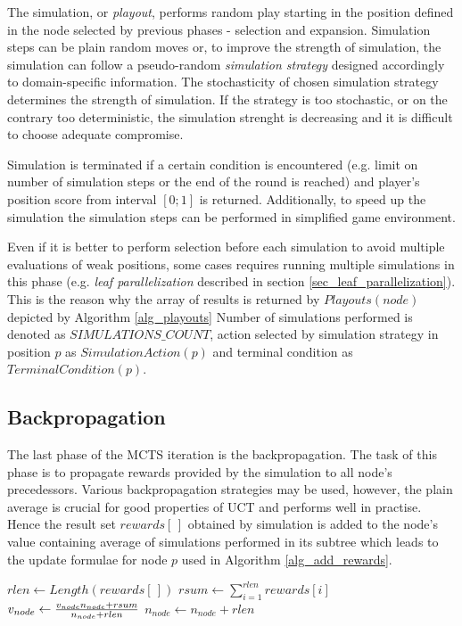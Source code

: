 The simulation, or \emph{playout}, performs random play starting in the position defined in the
node selected by previous phases - selection and expansion. Simulation steps can be plain
random moves or, to improve the strength of
simulation, the simulation can follow a pseudo-random \emph{simulation strategy} designed accordingly to
domain-specific information. The stochasticity of chosen simulation strategy determines the strength
of simulation. If the strategy is too stochastic, or on the contrary too deterministic, the
simulation strenght is decreasing and it is difficult to choose adequate compromise.

Simulation is terminated if a certain condition is encountered (e.g. limit on number of simulation
steps or the end of the round is reached) and player's position score from interval $[0;1]$ is
returned. Additionally, to speed up the simulation the simulation steps can be performed in
simplified game environment.

Even if it is better to perform selection before each simulation to avoid multiple 
evaluations of weak positions, some cases requires running multiple simulations in this phase
(e.g. \emph{leaf parallelization} described in section \ref{sec_leaf_parallelization}). This is
the reason why the array of results is returned by $Playouts(node)$ depicted by Algorithm
\ref{alg_playouts} Number of simulations performed is denoted as $SIMULATIONS\_COUNT$, action
selected by simulation strategy in position $p$ as $SimulationAction(p)$ and terminal condition
as $TerminalCondition(p)$.


\subsection{Backpropagation}

The last phase of the MCTS iteration is the backpropagation. The task of this phase is to propagate
rewards provided by the simulation to all node's precedessors. Various backpropagation strategies
may be used, however, the plain average is crucial for good properties of UCT and performs
well in
practise. Hence the result set $rewards[\,]$ obtained by simulation is added to the node's value containing
average of simulations performed in its subtree which leads to the update formulae for
node $p$ used in Algorithm \ref{alg_add_rewards}.

\begin{algorithm}
\DontPrintSemicolon
\caption{$AddRewards(node,rewards[\,])$\label{alg_add_rewards}}
$rlen \leftarrow Length(rewards[\,])$\;
$rsum \leftarrow \sum\limits_{i=1}^{rlen} rewards[i]$\;
$v_{node} \leftarrow {{v_{node} n_{node} + rsum}
    \over{n_{node} + rlen}}$\;
$n_{node} \leftarrow n_{node} + rlen$\;
\end{algorithm}



